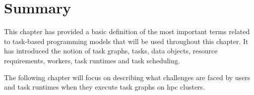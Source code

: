 \section*{Summary}
This chapter has provided a basic definition of the most important terms related to task-based
programming models that will be used throughout this chapter. It has introduced the notion of task
graphs, tasks, data objects, resource requirements, workers, task runtimes and task scheduling.

The following chapter will focus on describing what challenges are faced by users and task runtimes
when they execute task graphs on \gls{hpc} clusters.
